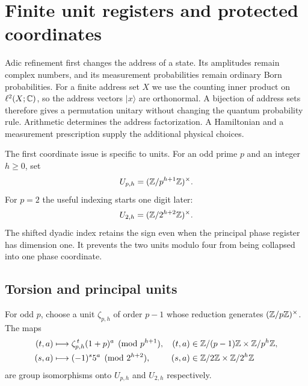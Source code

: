 \section{Finite unit registers and protected coordinates}
\label{a-finite-units}

Adic refinement first changes the address of a state. Its amplitudes remain
complex numbers, and its measurement probabilities remain ordinary Born
probabilities. For a finite address set $X$ we use the counting inner product
on $\ell^2(X;\mathbb C)$, so the address vectors $|x\rangle$ are orthonormal.
A bijection of address sets therefore gives a permutation unitary without
changing the quantum probability rule. Arithmetic determines the address
factorization. A Hamiltonian and a measurement prescription supply the
additional physical choices.

The first coordinate issue is specific to units. For an odd prime $p$ and
an integer $h\geq0$, set
\[
 U_{p,h}=(\mathbb Z/p^{h+1}\mathbb Z)^\times.
\]
For $p=2$ the useful indexing starts one digit later:
\[
 U_{2,h}=(\mathbb Z/2^{h+2}\mathbb Z)^\times.
\]
The shifted dyadic index retains the sign even when the principal phase
register has dimension one. It prevents the two units modulo four from
being collapsed into one phase coordinate.

\subsection{Torsion and principal units}

\begin{proposition}
\label{a-finite-unit-coordinates}
For odd $p$, choose a unit $\zeta_{p,h}$ of order $p-1$ whose reduction
generates $(\mathbb Z/p\mathbb Z)^\times$. The maps
\begin{align}
 (t,a)&\longmapsto\zeta_{p,h}^{\,t}(1+p)^a
       \pmod{p^{h+1}},
 & (t,a)&\in\mathbb Z/(p-1)\mathbb Z\times\mathbb Z/p^h\mathbb Z,
 \label{a-finite-odd-coordinate}\\
 (s,a)&\longmapsto(-1)^s5^a\pmod{2^{h+2}},
 & (s,a)&\in\mathbb Z/2\mathbb Z\times\mathbb Z/2^h\mathbb Z
 \label{a-finite-dyadic-coordinate}
\end{align}
are group isomorphisms onto $U_{p,h}$ and $U_{2,h}$ respectively.
\end{proposition}

